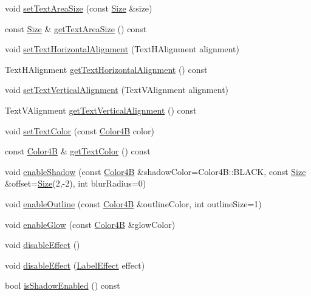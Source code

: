 \begin{DoxyCompactItemize}
\item 
void \hyperlink{classui_1_1Text_ae4367871d2db2710e945ff052d946406}{set\+Text\+Area\+Size} (const \hyperlink{classSize}{Size} \&size)
\item 
const \hyperlink{classSize}{Size} \& \hyperlink{classui_1_1Text_a2550cb716254fd8de865bfd718d609db}{get\+Text\+Area\+Size} () const
\item 
void \hyperlink{classui_1_1Text_a5adf856f6010e9d51ec8489755798f29}{set\+Text\+Horizontal\+Alignment} (Text\+H\+Alignment alignment)
\item 
Text\+H\+Alignment \hyperlink{classui_1_1Text_af7e0397afba65e46e886acda3252bc43}{get\+Text\+Horizontal\+Alignment} () const
\item 
void \hyperlink{classui_1_1Text_aad364f6da62bcbaf2c108bdb8e4a91a4}{set\+Text\+Vertical\+Alignment} (Text\+V\+Alignment alignment)
\item 
Text\+V\+Alignment \hyperlink{classui_1_1Text_a757828259333ef13e7e94037a065c6c8}{get\+Text\+Vertical\+Alignment} () const
\item 
void \hyperlink{classui_1_1Text_ac7643db4602dce42cd1f20e366761af6}{set\+Text\+Color} (const \hyperlink{structColor4B}{Color4B} color)
\item 
const \hyperlink{structColor4B}{Color4B} \& \hyperlink{classui_1_1Text_aa6da3cff534256faf9a1d91fc321f49c}{get\+Text\+Color} () const
\item 
void \hyperlink{classui_1_1Text_ae7ccb12e52bfa6d2408270de9777a53f}{enable\+Shadow} (const \hyperlink{structColor4B}{Color4B} \&shadow\+Color=Color4\+B\+::\+B\+L\+A\+CK, const \hyperlink{classSize}{Size} \&offset=\hyperlink{classSize}{Size}(2,-\/2), int blur\+Radius=0)
\item 
void \hyperlink{classui_1_1Text_a15c3d89aa5f6340b32224660ebc40b7e}{enable\+Outline} (const \hyperlink{structColor4B}{Color4B} \&outline\+Color, int outline\+Size=1)
\item 
void \hyperlink{classui_1_1Text_a8de721b6aefd2e5e419260f17a3d8cfc}{enable\+Glow} (const \hyperlink{structColor4B}{Color4B} \&glow\+Color)
\item 
void \hyperlink{classui_1_1Text_ae5bd4cff99d7c103a535af9233d42646}{disable\+Effect} ()
\item 
void \hyperlink{classui_1_1Text_aff721ec214ba8a01854e584b060c5f7c}{disable\+Effect} (\hyperlink{group__base_ga26fd049ca5303e0cf4435208058f32e4}{Label\+Effect} effect)
\item 
bool \hyperlink{classui_1_1Text_ad32c3307ad54191c5815fb8879c3dee2}{is\+Shadow\+Enabled} () const

\end{DoxyCompactItemize}
